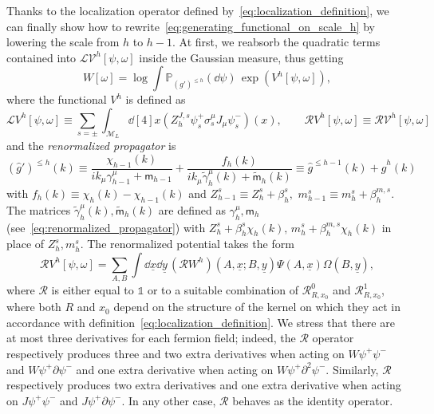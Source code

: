 \documentclass[a4paper, 11pt]{article}
\newcommand{\dgauss}[2]{\mathbb{P}_{#1}(\dd #2)}			%
\newcommand{\id}{\mathds{1}}								%
\newcommand{\sing}[2]{{#1}^{#2}}							%
\newcommand{\loc}{\mathcal{L}}								%
\newcommand{\ren}{\mathcal{R}}								%
\newcommand{\kren}{\mathscr{R}}								%
\newcommand{\src}{\omega}									%
\newcommand{\Src}{\Omega}
\theoremstyle{thm}
\begin{document}
Thanks to the localization operator defined by~\eqref{eq:localization_definition}, we can finally show how to rewrite~\eqref{eq:generating_functional_on_scale_h} by lowering the scale from $h$ to $h-1$. At first, we reabsorb the quadratic terms contained into $\loc \sing{\mathscr{V}}{h}[\psi, \src]$ inside the Gaussian measure, thus getting
\begin{equation}
\label{eq:generating_functional_RL_explicit}
W[\src] = \log \int \dgauss{\sing{(g')}{\le h}}{\psi} \, \exp( \sing{V}{h}[\psi, \src]),
\end{equation}
where the functional $\sing{V}{h}$ is defined as
\begin{equation}
\loc \sing{V}{h}[\psi, \src] \equiv \sum_{s = \pm} \int_{\mathcal{M}_L} \dd[4]{x} (Z^{J, s}_h \psi^+_s \sigma_s^\mu J_\mu \psi^-_s)(x), \qquad \ren \sing{V}{h}[\psi, \src] \equiv \ren \sing{\mathscr{V}}{h}[\psi, \src]
\end{equation}
and the \emph{renormalized propagator} is
\begin{equation}
\label{eq:propagator_splitting}
\sing{(\hat{g}')}{\le h}(k) \equiv \frac{\chi_{h-1}(k)}{i k_\mu \gamma^\mu_{h-1} + \mathsf{m}_{h-1}} + \frac{f_{h}(k)}{i k_\mu \tilde{\gamma}^\mu_{h}(k) + \tilde{\mathsf{m}}_{h}(k)} \equiv \sing{\hat{g}}{\le h-1}(k) + \sing{\hat{g}}{h}(k)
\end{equation}
with $f_h(k) \equiv \chi_h(k) - \chi_{h-1}(k)$ and $Z^s_{h-1} \equiv Z^s_h + \beta^s_h, \,\, m^s_{h-1} \equiv m^s_h + \beta^{m,s}_h$. The matrices $\tilde{\gamma}^\mu_h(k), \tilde{\mathsf{m}}_h(k)$ are defined as $\gamma^\mu_h, \mathsf{m}_h$ (see~\eqref{eq:renormalized_propagator}) with $Z^s_h + \beta^s_h \chi_h(k), \, m^s_h + \beta^{m, s}_h \chi_h(k)$ in place of $Z^s_h, m^s_h$. The renormalized potential takes the form
\begin{equation}
\label{eq:veff_kernelsr}
\ren \sing{V}{h}[\psi, \src] = \sum_{A, B} \int \dd{\underline{x}} \dd{\underline{y}} \, (\kren \sing{W}{h})(A, \underline{x}; B, \underline{y}) \Psi(A, \underline{x}) \Src(B, \underline{y}),
\end{equation}
where $\kren$ is either equal to $\id$ or to a suitable combination of $\kren^0_{R, x_0}$ and $\kren^1_{R, x_0}$, where both $R$ and $x_0$ depend on the structure of the kernel on which they act in accordance with definition~\eqref{eq:localization_definition}. We stress that there are at most three derivatives for each fermion field; indeed, the $\ren$ operator respectively produces three and two extra derivatives when acting on $W \psi^+ \psi^-$ and $W \psi^+ \partial \psi^-$ and one extra derivative when acting on $W \psi^+ \partial^2 \psi^-$. Similarly, $\ren$ respectively produces two extra derivatives and one extra derivative when acting on $J \psi^+\psi^-$ and $J \psi^+ \partial \psi^-$. In any other case, $\ren$ behaves as the identity operator.
\end{document}
